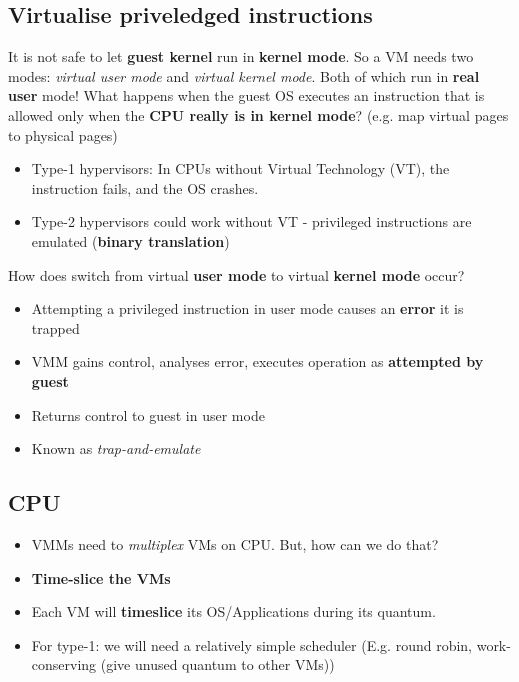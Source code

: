 \documentclass{article}
\begin{document}
\subsection{Virtualise priveledged instructions}
\begin{flushleft}
It is not safe to let \textbf{guest kernel} run in \textbf{kernel mode}. So a VM needs two modes: \textit{virtual user mode} and \textit{virtual kernel mode}. Both of which run in \textbf{real user} mode! What happens when the guest OS executes an instruction that is allowed only when the \textbf{CPU really is in kernel mode}? (e.g. map virtual pages to physical pages)
\begin{itemize}
	\item Type-1 hypervisors: In CPUs without Virtual Technology (VT), the instruction fails, and the OS crashes.
	\item Type-2 hypervisors could work without VT - privileged instructions are emulated (\textbf{binary translation})
\end{itemize}
\bigskip
How does switch from virtual \textbf{user mode} to virtual \textbf{kernel mode} occur?
\begin{itemize}
	\item Attempting a privileged instruction in user mode causes an \textbf{error} it is trapped
	\item VMM gains control, analyses error, executes operation as \textbf{attempted by guest}
	\item Returns control to guest in user mode
	\item Known as \textit{trap-and-emulate}
\end{itemize}
\end{flushleft}

\subsection{CPU}
\begin{itemize}
	\item VMMs need to \textit{multiplex} VMs on CPU. But, how can we do that?
	\item \textbf{Time-slice the VMs}
	\item Each VM will \textbf{timeslice} its OS/Applications during its quantum.
	\item For type-1: we will need a relatively simple scheduler (E.g. round robin, work-conserving (give unused quantum to other VMs))
\end{itemize}
\end{document}
